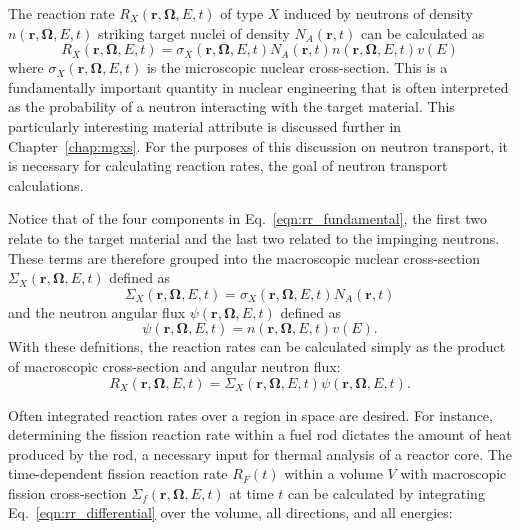 The reaction rate $R_X(\mathbf{r}, \mathbf{\Omega}, E, t)$ of type $X$ induced by neutrons of density $n(\mathbf{r}, \mathbf{\Omega}, E, t)$ striking target nuclei of density $N_A(\mathbf{r}, t)$ can be calculated as
\begin{equation}
R_X(\mathbf{r}, \mathbf{\Omega}, E, t) = \sigma_X(\mathbf{r}, \mathbf{\Omega}, E, t) N_A(\mathbf{r}, t) n(\mathbf{r}, \mathbf{\Omega}, E, t) v(E) 
\label{eqn:rr_fundamental}
\end{equation}
where $\sigma_X(\mathbf{r}, \mathbf{\Omega}, E, t)$ is the microscopic nuclear cross-section. This is a fundamentally important quantity in nuclear engineering that is often interpreted as the probability of a neutron interacting with the target material. This particularly interesting material attribute is discussed further in Chapter~\ref{chap:mgxs}. For the purposes of this discussion on neutron transport, it is necessary for calculating reaction rates, the goal of neutron transport calculations.

Notice that of the four components in Eq.~\ref{eqn:rr_fundamental}, the first two relate to the target material and the last two related to the impinging neutrons. These terms are therefore grouped into the macroscopic nuclear cross-section $\Sigma_X(\mathbf{r}, \mathbf{\Omega}, E, t)$ defined as
\begin{equation}
\Sigma_X(\mathbf{r}, \mathbf{\Omega}, E, t) = \sigma_X(\mathbf{r}, \mathbf{\Omega}, E, t) N_A(\mathbf{r}, t)
\end{equation} 
and the neutron angular flux $\psi(\mathbf{r}, \mathbf{\Omega}, E, t)$ defined as
\begin{equation}
\psi(\mathbf{r}, \mathbf{\Omega}, E, t) = n(\mathbf{r}, \mathbf{\Omega}, E, t) v(E).
\label{eqn:angular_neutron_flux}
\end{equation}
With these defnitions, the reaction rates can be calculated simply as the product of macroscopic cross-section and angular neutron flux:
\begin{equation}
R_X(\mathbf{r}, \mathbf{\Omega}, E, t) = \Sigma_X(\mathbf{r}, \mathbf{\Omega}, E, t) \psi(\mathbf{r}, \mathbf{\Omega}, E, t).
\label{eqn:rr_differential}
\end{equation}

Often integrated reaction rates over a region in space are desired. For instance, determining the fission reaction rate within a fuel rod dictates the amount of heat produced by the rod, a necessary input for thermal analysis of a reactor core. The time-dependent fission reaction rate $R_F(t)$ within a volume $V$ with macroscopic fission cross-section $\Sigma_f(\mathbf{r}, \mathbf{\Omega}, E, t)$ at time $t$ can be calculated by integrating Eq.~\ref{eqn:rr_differential} over the volume, all directions, and all energies:

